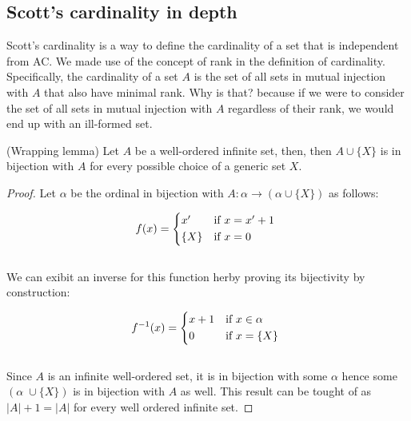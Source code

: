 \subsection{Scott's cardinality in depth}
Scott's cardinality is a way to define the cardinality of a set that is independent from 
AC. We made use of the concept of rank in the definition of
cardinality. Specifically, the cardinality of a set $A$ is the set of all sets in
mutual injection with $A$ that also have minimal rank. Why is that? because if we 
were to consider the set of all sets in mutual injection with $A$ regardless of their rank, 
we would end up with an ill-formed set.

\begin{lemma}(Wrapping lemma)
    Let $A$ be a well-ordered infinite set, then, then $A \cup \{ X \}$ is 
    in bijection with $A$ for every possible choice of a generic set $X$.
\end{lemma}
\begin{proof}
    Let $\alpha$ be the ordinal in bijection with $A : \alpha \rightarrow (\alpha \cup \{X\})$ as follows:

    \begin{equation*}
        f(x) = 
        \begin{cases*}
            x' & if \( x = x' + 1 \)          \\
            \{X\}  & if \( x = 0 \)       \\
        \end{cases*}
    \end{equation*}                           \\

    We can exibit an inverse for this function herby proving its bijectivity by construction:

    \begin{equation*}
        f^{-1}(x) = 
        \begin{cases*}
            x + 1      & if \( x \in \alpha \)  \\
            0          & if \( x = \{X\} \) \\
        \end{cases*}
    \end{equation*}                             \\

    Since $A$ is an infinite well-ordered set, it is in bijection with some $\alpha$ hence some $(\alpha \;\cup \{X\})$ is in 
    bijection with $A$ as well. This result can be tought of as $|A| + 1 = |A|$ for every well ordered infinite set.
    

\end{proof}

